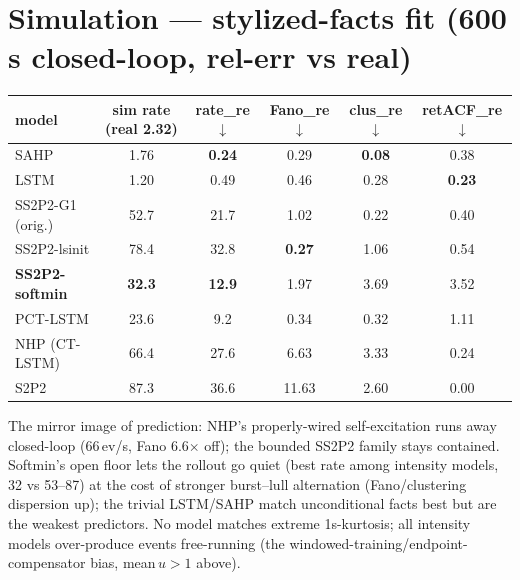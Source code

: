 \documentclass[11pt]{article}
\newcommand{\bb}[1]{\textbf{#1}}
\begin{document}
\section{Simulation --- stylized-facts fit (600\,s closed-loop, rel-err vs real)}
\begin{center}\small\renewcommand{\arraystretch}{1.22}
\begin{tabular}{lccccc}
\toprule
model & sim rate (real 2.32) & rate\_re$\downarrow$ & Fano\_re$\downarrow$ & clus\_re$\downarrow$ & retACF\_re$\downarrow$\\
\midrule
SAHP & 1.76 & \bb{0.24} & 0.29 & \bb{0.08} & 0.38\\
LSTM & 1.20 & 0.49 & 0.46 & 0.28 & \bb{0.23}\\
\rowcolor{ours}SS2P2-G1 (orig.) & 52.7 & 21.7 & 1.02 & 0.22 & 0.40\\
\rowcolor{ours}SS2P2-lsinit & 78.4 & 32.8 & \bb{0.27} & 1.06 & 0.54\\
\rowcolor{ours}\textbf{SS2P2-softmin} & \bb{32.3} & \bb{12.9} & 1.97 & 3.69 & 3.52\\
PCT-LSTM & 23.6 & 9.2 & 0.34 & 0.32 & 1.11\\
NHP (CT-LSTM) & 66.4 & 27.6 & 6.63 & 3.33 & 0.24\\
S2P2 & 87.3 & 36.6 & 11.63 & 2.60 & 0.00\\
\bottomrule
\end{tabular}
\end{center}
\noindent The mirror image of prediction: NHP's properly-wired self-excitation runs away closed-loop
(66\,ev/s, Fano 6.6$\times$ off); the bounded SS2P2 family stays contained. Softmin's open floor lets the
rollout go quiet (best rate among intensity models, 32 vs 53--87) at the cost of stronger burst--lull
alternation (Fano/clustering dispersion up); the trivial LSTM/SAHP match unconditional facts best but are
the weakest predictors. No model matches extreme 1s-kurtosis; all intensity models over-produce events
free-running (the windowed-training/endpoint-compensator bias, mean\,$u>1$ above).
\end{document}
